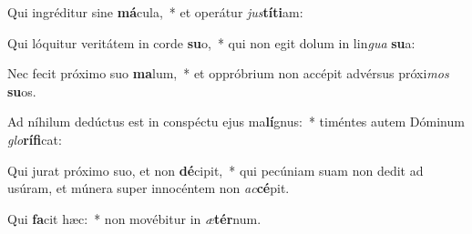 \item Qui ingréditur sine \textbf{má}cula,~* et operátur \textit{jus}\textbf{tí}\textbf{ti}am:
\item Qui lóquitur veritátem in corde \textbf{su}o,~* qui non egit dolum in lin\textit{gua} \textbf{su}a:
\item Nec fecit próximo suo \textbf{ma}lum,~* et oppróbrium non accépit advérsus próxi\textit{mos} \textbf{su}os.
\item Ad níhilum dedúctus est in conspéctu ejus ma\textbf{lí}gnus:~* timéntes autem Dóminum \textit{glo}\textbf{rí}\textbf{fi}cat:
\item Qui jurat próximo suo, et non \textbf{dé}cipit,~* qui pecúniam suam non dedit ad usúram, et múnera super innocéntem non \textit{ac}\textbf{cé}pit.
\item Qui \textbf{fa}cit hæc:~* non movébitur in \textit{æ}\textbf{tér}num.
